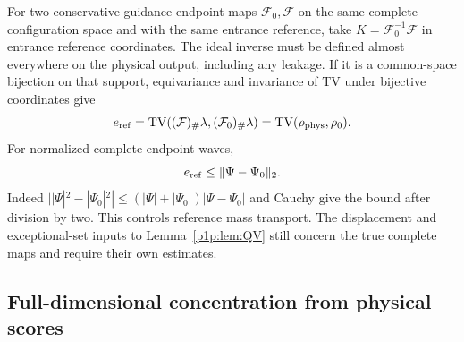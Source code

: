 \documentclass[11pt]{article}
\numberwithin{equation}{section}
\theoremstyle{definition}
\theoremstyle{remark}
\begin{document}
For two conservative guidance endpoint maps $\mathcal F_0,\mathcal F$
on the same complete configuration space and with the same entrance
reference, take $K=\mathcal F_0^{-1}\mathcal F$ in entrance reference
coordinates. The ideal inverse must be defined almost everywhere on
the physical output, including any leakage. If it is a common-space
bijection on that support, equivariance and invariance of TV under
bijective coordinates give
\[
 e_{\rm ref}=\operatorname{TV}((\mathcal F)_\#\lambda,(\mathcal F_0)_\#\lambda)
 =\operatorname{TV}(\rho_{\rm phys},\rho_0).
\]
For normalized complete endpoint waves,
\begin{equation}\label{p1p:eq:waveReference}
 e_{\rm ref}\leq\|\Psi-\Psi_0\|_2.
\end{equation}
Indeed $||\Psi|^2-|\Psi_0|^2|\leq
(|\Psi|+|\Psi_0|)|\Psi-\Psi_0|$ and Cauchy give the bound after division
by two. This controls reference mass transport. The displacement and
exceptional-set inputs to Lemma~\ref{p1p:lem:QV} still concern the true
complete maps and require their own estimates.

\subsection{Full-dimensional concentration from physical scores}
\end{document}
